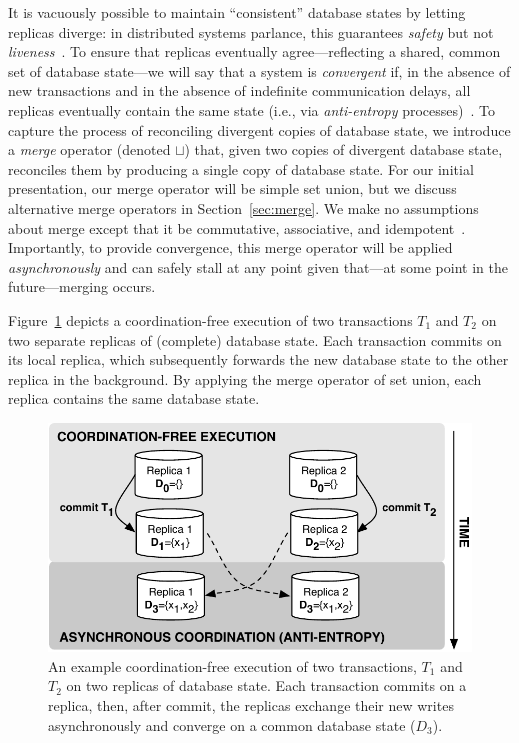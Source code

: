 It is vacuously possible to maintain ``consistent'' database states by
letting replicas diverge: in distributed systems parlance, this
guarantees \textit{safety} but not
\textit{liveness}~\cite{lamport-safety}. To ensure that replicas
eventually agree---reflecting a shared, common set of database
state---we will say that a system is \textit{convergent} if, in the
absence of new transactions and in the absence of indefinite
communication delays, all replicas eventually contain the same state
(i.e., via \textit{anti-entropy} processes)~\cite{vogels-defs}. To
capture the process of reconciling divergent copies of database state,
we introduce a \textit{merge} operator (denoted $\sqcup$) that, given
two copies of divergent database state, reconciles them by producing a
single copy of database state. For our initial presentation, our merge
operator will be simple set union, but we discuss alternative merge
operators in Section~\ref{sec:merge}. We make no assumptions about
merge except that it be commutative, associative, and
idempotent~\cite{calm,crdt}. Importantly, to provide convergence, this
merge operator will be applied \textit{asynchronously} and can safely
stall at any point given that---at some point in the future---merging
occurs.

Figure~\ref{fig:replicas} depicts a coordination-free execution of two
transactions $T_1$ and $T_2$ on two separate replicas of (complete)
database state. Each transaction commits on its local replica, which
subsequently forwards the new database state to the other replica in
the background. By applying the merge operator of set union, each
replica contains the same database state.

\begin{figure}
\begin{center}
\includegraphics[width=.85\columnwidth]{figs/replicas.pdf}
\end{center}\vspace{-1em}
\caption{An example coordination-free execution of two transactions,
  $T_1$ and $T_2$ on two replicas of database state. Each transaction
  commits on a replica, then, after commit, the replicas exchange
  their new writes asynchronously and converge on a common database
  state ($D_3$).}
\label{fig:replicas}
\end{figure}

